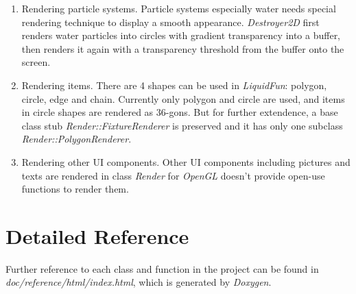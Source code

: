 \documentclass[UTF8]{ctexart}
\begin{document}
            \begin{enumerate}
                \item Rendering particle systems. Particle systems especially water needs special rendering technique to display a smooth appearance. \textit{Destroyer2D} first renders water particles into circles with gradient transparency into a buffer, then renders it again with a transparency threshold from the buffer onto the screen.
                \item Rendering items. There are 4 shapes can be used in \textit{LiquidFun}: polygon, circle, edge and chain. Currently only polygon and circle are used, and items in circle shapes are rendered as 36-gons. But for further extendence, a base class stub \textit{Render::FixtureRenderer} is preserved and it has only one subclass \textit{Render::PolygonRenderer}.
                \item Rendering other UI components. Other UI components including pictures and texts are rendered in class \textit{Render} for \textit{OpenGL} doesn't provide open-use functions to render them.
            \end{enumerate}

    \section{Detailed Reference}

        Further reference to each class and function in the project can be found in \textit{doc/reference/html/index.html}, which is generated by \textit{Doxygen}.
\end{document}
